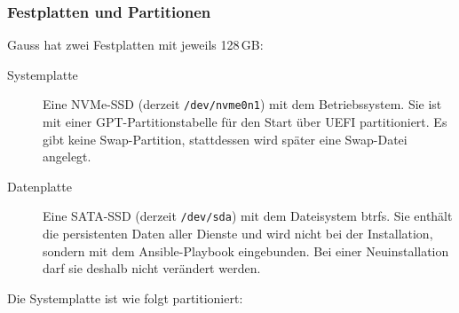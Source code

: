 \subsubsection{Festplatten und Partitionen}
\label{gauss-partitionen}
Gauss hat zwei Festplatten mit jeweils 128\,GB:
\begin{description}
	\item[Systemplatte] Eine NVMe-SSD (derzeit \texttt{/dev/nvme0n1}) mit dem Betriebssystem. Sie ist mit einer GPT-Partitionstabelle für den Start über UEFI partitioniert. Es gibt keine Swap-Partition, stattdessen wird später eine Swap-Datei angelegt.
	\item[Datenplatte] Eine SATA-SSD (derzeit \texttt{/dev/sda}) mit dem Dateisystem btrfs. Sie enthält die persistenten Daten aller Dienste und wird nicht bei der Installation, sondern mit dem Ansible-Playbook eingebunden. Bei einer Neuinstallation darf sie deshalb nicht verändert werden.
\end{description}

Die Systemplatte ist wie folgt partitioniert:

\begin{config}
\end{config}

\begin{config}
\end{config}
